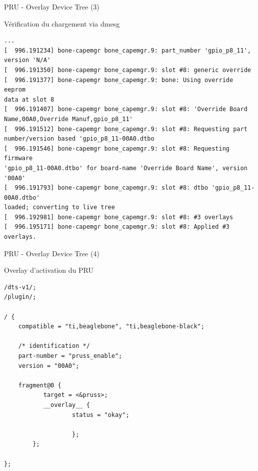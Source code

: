 \documentclass{beamer}
\begin{document}
\begin{frame}[containsverbatim]{PRU - Overlay Device Tree (3)}
  \begin{tiny} V\'erification du chargement via dmesg \end{tiny}
  \lstset{language=C++}
  \begin{lstlisting}[frame=tb]
...
[  996.191234] bone-capemgr bone_capemgr.9: part_number 'gpio_p8_11',
version 'N/A'
[  996.191350] bone-capemgr bone_capemgr.9: slot #8: generic override
[  996.191377] bone-capemgr bone_capemgr.9: bone: Using override eeprom
data at slot 8
[  996.191407] bone-capemgr bone_capemgr.9: slot #8: 'Override Board
Name,00A0,Override Manuf,gpio_p8_11'
[  996.191512] bone-capemgr bone_capemgr.9: slot #8: Requesting part
number/version based 'gpio_p8_11-00A0.dtbo
[  996.191546] bone-capemgr bone_capemgr.9: slot #8: Requesting firmware
'gpio_p8_11-00A0.dtbo' for board-name 'Override Board Name', version '00A0'
[  996.191793] bone-capemgr bone_capemgr.9: slot #8: dtbo 'gpio_p8_11-00A0.dtbo'
loaded; converting to live tree
[  996.192981] bone-capemgr bone_capemgr.9: slot #8: #3 overlays
[  996.195171] bone-capemgr bone_capemgr.9: slot #8: Applied #3 overlays.
  \end{lstlisting}
\end{frame}


\begin{frame}[containsverbatim]{PRU - Overlay Device Tree (4)}
  \begin{tiny} Overlay d'activation du PRU \end{tiny}
  \lstset{language=C++}
  \begin{lstlisting}[frame=tb]
/dts-v1/;
/plugin/;

/ {
	compatible = "ti,beaglebone", "ti,beaglebone-black";

	/* identification */
	part-number = "pruss_enable";
	version = "00A0";

 	fragment@0 {
  		   target = <&pruss>;
		   __overlay__ {
		   	       status = "okay";

    	           };
        };

};
  \end{lstlisting}
\end{frame}
\end{document}
